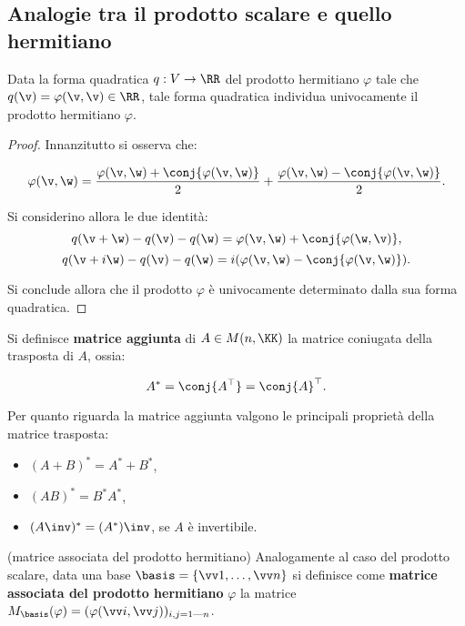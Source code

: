 \subsection{Analogie tra il prodotto scalare e quello hermitiano}

\begin{proposition}
	Data la forma quadratica $q : V \to \RR$  del prodotto hermitiano $\varphi$ tale che $q(\v) = \varphi(\v, \v) \in \RR$, tale
	forma quadratica individua univocamente il prodotto hermitiano $\varphi$.
\end{proposition}

\begin{proof}
	Innanzitutto si osserva che:
	
	\[ \varphi(\v, \w) = \frac{\varphi(\v, \w) + \conj{\varphi(\v, \w)}}{2} +  \frac{\varphi(\v, \w) - \conj{\varphi(\v, \w)}}{2}. \]
	
	\vskip 0.05in
	
	Si considerino allora le due identità:
	\[ q(\v + \w) - q(\v) - q(\w) =
	\varphi(\v, \w) + \conj{\varphi(\w, \v)}, \]
	\[ q(\v + i\w) - q(\v) - q(\w) = i(\varphi(\v, \w) - \conj{\varphi(\v, \w)}). \]
	
	\vskip 0.05in
	
	Si conclude allora che il prodotto $\varphi$ è univocamente
	determinato dalla sua forma quadratica.
\end{proof}

\begin{definition}
	Si definisce \textbf{matrice aggiunta} di $A \in M(n, \KK)$ la matrice coniugata della trasposta di $A$, ossia:
	
	\[ A^* = \conj{A^\top} = \conj{A}^\top. \]
\end{definition}

\begin{remark}
	Per quanto riguarda la matrice aggiunta valgono le principali proprietà della matrice trasposta:
	
	\begin{itemize}
		\item $(A + B)^* = A^* + B^*$,
		\item $(AB)^* = B^* A^*$,
		\item $(A\inv)^* = (A^*)\inv$, se $A$ è invertibile.
	\end{itemize}
\end{remark}


\begin{definition} (matrice associata del prodotto hermitiano) Analogamente
	al caso del prodotto scalare, data una base $\basis = \{\vv 1, \ldots, \vv n\}$ si definisce
	come \textbf{matrice associata del prodotto hermitiano} $\varphi$
	la matrice $M_\basis(\varphi) = (\varphi(\vv i, \vv j))_{i,j = 1 \textrm{---} n}$.
\end{definition}

